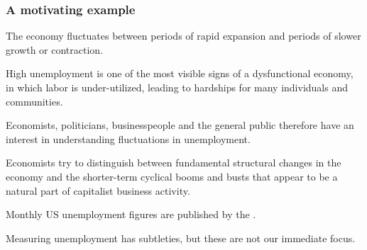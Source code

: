 \begin{frame}[fragile]

\frametitle{A motivating example}


\bi
\item The economy fluctuates between periods of rapid expansion and periods of slower growth or contraction. 

\item High unemployment is one of the most visible signs of a dysfunctional economy, in which labor is under-utilized, leading to hardships for many individuals and communities.

\item Economists, politicians, businesspeople and the general public therefore have an interest in understanding fluctuations in unemployment.

\item Economists try to distinguish between fundamental structural changes in the economy and the shorter-term cyclical booms and busts that appear to be a natural part of capitalist business activity.

\item Monthly US unemployment figures are published by the .

\item Measuring unemployment has subtleties, but these are not our immediate focus.
\ei

\end{frame}
